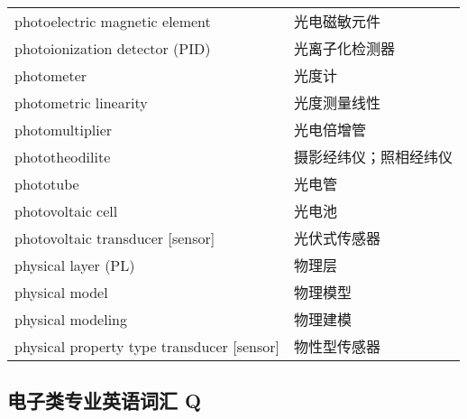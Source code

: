 \documentclass[
]{article}
\begin{document}
\begin{longtable}[]{@{}ll@{}}
photoelectric magnetic element & 光电磁敏元件 \\
photoionization detector (PID) & 光离子化检测器 \\
photometer & 光度计 \\
photometric linearity & 光度测量线性 \\
photomultiplier & 光电倍增管 \\
phototheodilite & 摄影经纬仪；照相经纬仪 \\
phototube & 光电管 \\
photovoltaic cell & 光电池 \\
photovoltaic transducer {[}sensor{]} & 光伏式传感器 \\
physical layer (PL) & 物理层 \\
physical model & 物理模型 \\
physical modeling & 物理建模 \\
physical property type transducer {[}sensor{]} & 物性型传感器 \\
\bottomrule()
\end{longtable}

\hypertarget{ux7535ux5b50ux7c7bux4e13ux4e1aux82f1ux8bedux8bcdux6c47-q}{%
\subsection{\texorpdfstring{电子类专业英语词汇 Q
}{电子类专业英语词汇 Q }}\label{ux7535ux5b50ux7c7bux4e13ux4e1aux82f1ux8bedux8bcdux6c47-q}}
\end{document}
